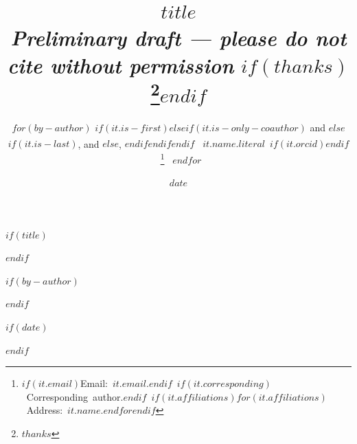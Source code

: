 %
%
%

$if(title)$
\title{$title$\\[0.3cm]%
{\normalsize\itshape Preliminary draft --- please do not cite without permission}%
$if(thanks)$\thanks{$thanks$}$endif$%
}
$endif$

$if(by-author)$
\author{%
$for(by-author)$%
$if(it.is-first)$$else$$if(it.is-only-coauthor)$ and $else$$if(it.is-last)$, and $else$, $endif$$endif$$endif$%
\mbox{%
$it.name.literal$%
$if(it.orcid)$\textsuperscript{\normalsize{}}$endif$%
\thanks{%
$if(it.email)$Email: \href{mailto:$it.email$}{$it.email$}.$endif$%
$if(it.corresponding)$ Corresponding author.$endif$%
$if(it.affiliations)$$for(it.affiliations)$ Address: $it.name$.$endfor$$endif$%
}%
}%
$endfor$%
}
$endif$

$if(date)$
\date{$date$}
$endif$
